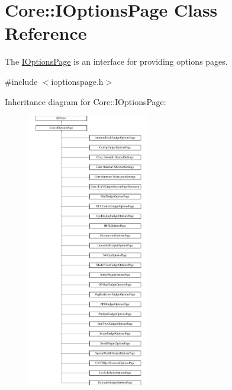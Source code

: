 \hypertarget{class_core_1_1_i_options_page}{\section{Core\-:\-:I\-Options\-Page Class Reference}
\label{class_core_1_1_i_options_page}
}


The \hyperlink{class_core_1_1_i_options_page}{I\-Options\-Page} is an interface for providing options pages.  




{\ttfamily \#include $<$ioptionspage.\-h$>$}

Inheritance diagram for Core\-:\-:I\-Options\-Page\-:\begin{figure}[H]
\begin{center}
\leavevmode
\includegraphics[height=12.000000cm]{class_core_1_1_i_options_page}
\end{center}
\end{figure}
